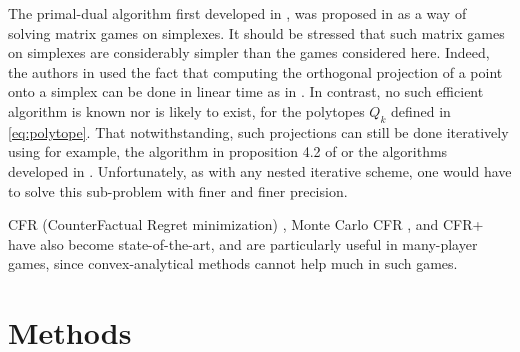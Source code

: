 \documentclass[a4paper,9pt]{extarticle}
\begin{document}


The primal-dual algorithm first developed in \cite{chambolle2010}, was
proposed in \cite{chambolle2014ergodic} as a way of solving matrix
games on simplexes. It should be stressed that such matrix games on
simplexes are considerably simpler than the games considered
here. Indeed, the authors in \cite{chambolle2014ergodic} used the fact
that computing the orthogonal projection of a point onto a simplex can
be done in linear time as in \cite{duchi2008efficient}. In contrast,
no such efficient algorithm is known nor is likely to exist, for the
polytopes $Q_k$ defined in \eqref{eq:polytope}.%
That notwithstanding, such projections can still be done iteratively
using for example, the algorithm in proposition 4.2 of
\cite{combettes2010dualization} or the algorithms developed in
\cite{tran2015splitting}. Unfortunately, as with any nested iterative
scheme, one would have to solve this sub-problem with finer and finer
precision.


CFR (CounterFactual Regret minimization) \cite{zinkevich2008regret},
Monte Carlo CFR \cite{lanctot2009monte}, and CFR+
\cite{Bowling09012015} have also become state-of-the-art, and are
particularly useful in many-player games, since convex-analytical
methods cannot help much in such games.


\section{Methods}
\label{sec:gsp}
\end{document}

